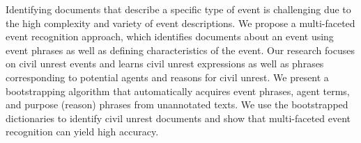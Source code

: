 Identifying documents that describe a specific type of event is challenging due to the high
 complexity and variety of event descriptions.
 We propose a multi-faceted event recognition
 approach, which identifies documents about
 an event using event phrases as well as defining
 characteristics of the event. Our research
 focuses on civil unrest events and learns civil
 unrest expressions as well as phrases corresponding
 to potential agents and reasons
 for civil unrest. We present a bootstrapping
 algorithm that automatically acquires event
 phrases, agent terms, and purpose (reason)
 phrases from unannotated texts. We use the
 bootstrapped dictionaries to identify civil unrest
 documents and show that multi-faceted
 event recognition can yield high accuracy.

